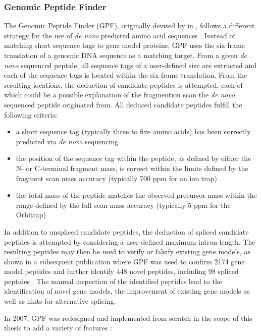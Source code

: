 \subsubsection{Genomic Peptide Finder}

\label{section:gpf}

The Genomic Peptide Finder (GPF), originally devised by \citeauthor{Allmer2004} 
in \citeyear{Allmer2004}, follows a different strategy for the use of 
{\em de novo} predicted amino acid sequences \citep{Allmer2004}.
Instead of matching short sequence tags to gene model proteins, GPF uses the
six frame translation of a genomic DNA sequence as a matching target.
From a given {\em de novo} sequenced peptide, all sequence tags of a 
user-defined size are extracted and each of the sequence tags is located
within the six frame translation.
From the resulting locations, the deduction of candidate peptides is attempted,
each of which could be a possible explanation of the fragmention scan the
{\em de novo} sequenced peptide originated from.
All deduced candidate peptides fulfill the following criteria:

\begin{itemize}
\item a short sequence tag (typically three to five amino acids) has been 
correctly predicted via {\em de novo} sequencing 
\item the position of the sequence tag within the peptide, as defined by
either the N- or C-terminal fragment mass, is correct within the limits 
defined by the fragment scan mass accuracy (typically 700 ppm for an ion trap)
\item the total mass of the peptide matches the observed precursor mass
within the range defined by the full scan mass accuracy (typically 5 ppm for 
the Orbitrap)
\end{itemize}

In addition to unspliced candidate peptides, the deduction of spliced candidate
peptides is attempted by considering a user-defined maximum intron length.
The resulting peptides may then be used to verify or falsify existing gene 
models, as shown in a subsequent publication where GPF was used to confirm 
2174 gene model peptides and further identify 448 novel peptides, including 98 
spliced peptides \citep{Allmer2006}.
The manual inspection of the identified peptides lead to the identification
of novel gene models, the improvement of existing gene models as well as 
hints for alternative splicing.

In 2007, GPF was redesigned and implemented from scratch in the scope of this
thesis to add a variety of features \citep{Specht2011_GPF}:

